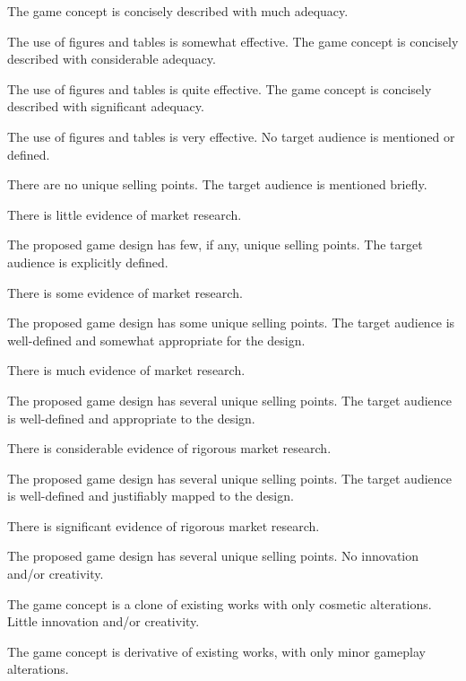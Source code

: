 \documentclass{../fal_assignment}
\begin{document}
\begin{markingrubric}
        \grade The game concept is concisely described with much adequacy.
            \par The use of figures and tables is somewhat effective.
        \grade The game concept is concisely described with considerable adequacy.
            \par The use of figures and tables is quite effective.
        \grade The game concept is concisely described with significant adequacy.
            \par The use of figures and tables is very effective.
%
        \grade\fail No target audience is mentioned or defined.
            \par There are no unique selling points.
        \grade The target audience is mentioned briefly.
            \par There is little evidence of market research.
            \par The proposed game design has few, if any, unique selling points.
        \grade The target audience is explicitly defined.
            \par There is some evidence of market research.
            \par The proposed game design has some unique selling points.
        \grade The target audience is well-defined and somewhat appropriate for the design.
            \par There is much evidence of market research.
            \par The proposed game design has several unique selling points.
        \grade The target audience is well-defined and appropriate to the design.
            \par There is considerable evidence of rigorous market research.
            \par The proposed game design has several unique selling points.
        \grade The target audience is well-defined and justifiably mapped to the design.
            \par There is significant evidence of rigorous market research.
            \par The proposed game design has several unique selling points.
%
        \grade\fail No innovation and/or creativity.
            \par The game concept is a clone of existing works with only cosmetic alterations.
        \grade Little innovation and/or creativity.
            \par The game concept is derivative of existing works, with only minor gameplay alterations.

\end{markingrubric}
\end{document}
